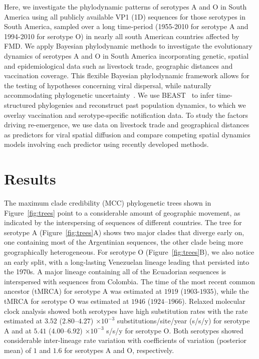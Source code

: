 \documentclass[10pt]{article}
\begin{document}
Here, we investigate the phylodynamic patterns of serotypes A and O in South America using all publicly available VP1 (1D) sequences for those serotypes in South America, sampled over a long time-period (1955-2010 for serotype A and 1994-2010 for serotype O) in nearly all south American countries affected by FMD.
We apply Bayesian phylodynamic methods to investigate the evolutionary dynamics of serotypes A and O in South America incorporating  genetic, spatial and epidemiological data such as livestock trade, geographic distances and vaccination coverage.
This flexible Bayesian phylodynamic framework allows for the testing of hypotheses concerning viral dispersal, while naturally accommodating phylogenetic uncertainty~\citep{Lemey2009, Faria2011}. %
We use BEAST~\citep{Suchard2018} to infer time-structured phylogenies and reconstruct past population dynamics, to which we overlay vaccination and serotype-specific notification data.
To study the factors driving re-emergence, we use data on livestock trade and geographical distances as predictors for viral spatial diffusion and compare competing spatial dynamics models involving each predictor using recently developed methods. %


\section*{Results}

The maximum clade credibility (MCC) phylogenetic trees shown in Figure~\ref{fig:trees} point to a considerable amount of geographic movement, as indicated by the interspersing of sequences of different countries.
The tree for serotype A (Figure~\ref{fig:trees}A) shows two major clades that diverge early on, one containing most of the Argentinian sequences, the other clade being more geographically heterogeneous.
For serotype O (Figure~\ref{fig:trees}B), we also notice an early split, with a long-lasting Venezuelan lineage leading that persisted into the 1970s. 
A major lineage containing all of the Ecuadorian sequences is interspersed with sequences from Colombia.
The time of the most recent common ancestor (tMRCA) for serotype A was estimated at $1919$ ($1903$-$1935$), while the tMRCA for serotype O was estimated at $1946$ ($1924$--$1966$).
Relaxed molecular clock analysis showed both serotypes have high substitution rates with the rate estimated at $3.52$ ($2.80$--$4.27$) $\times 10^{-3}$ substitutions/site/year (s/s/y) for serotype A  and at  $5.41$ ($4.00$--$6.92$) $\times 10^{-3}$ s/s/y for serotype O.
Both serotypes showed considerable inter-lineage rate variation with coefficients of variation (posterior mean) of $1$ and $1.6$ for serotypes A and O, respectively.
\end{document}
